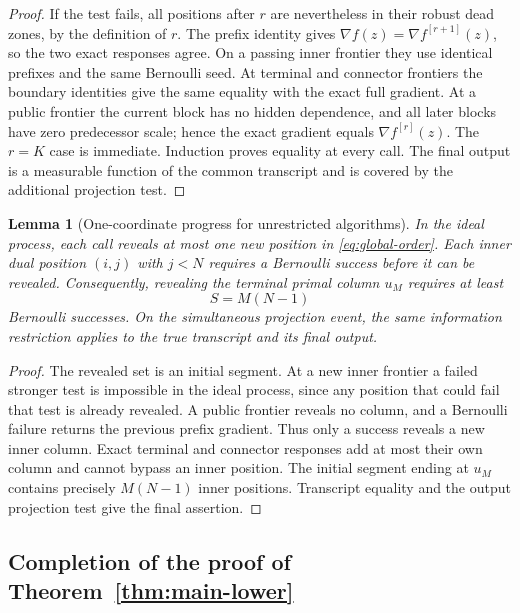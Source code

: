 \documentclass[11pt,a4paper]{article}
\newtheorem{lemma}[theorem]{Lemma}
\theoremstyle{definition}
\theoremstyle{remark}
\numberwithin{equation}{section}
\begin{document}
\begin{proof}
If the test fails, all positions after $r$ are nevertheless in their
robust dead zones, by the definition of $r$.  The prefix identity gives
$\nabla f(z)=\nabla f^{[r+1]}(z)$, so the two exact responses agree.
On a passing inner frontier they use identical prefixes and the same
Bernoulli seed.  At terminal and connector frontiers the boundary
identities give the same equality with the exact full gradient.  At a
public frontier the current block has no hidden dependence, and all
later blocks have zero predecessor scale; hence the exact gradient
equals $\nabla f^{[r]}(z)$.  The $r=K$ case is immediate.
Induction proves equality at every call.  The final output is a
measurable function of the common transcript and is covered by the
additional projection test.
\end{proof}

\begin{lemma}[One-coordinate progress for unrestricted algorithms]
\label{lem:progress}
In the ideal process, each call reveals at most one new position in
\eqref{eq:global-order}.  Each inner dual position $(i,j)$ with $j<N$
requires a Bernoulli success before it can be revealed.  Consequently,
revealing the terminal primal column $u_M$ requires at least
\begin{equation}
 S=M(N-1)
 \label{eq:S}
\end{equation}
Bernoulli successes.  On the simultaneous projection event, the same
information restriction applies to the true transcript and its final
output.
\end{lemma}

\begin{proof}
The revealed set is an initial segment.  At a new inner frontier a
failed stronger test is impossible in the ideal process, since any
position that could fail that test is already revealed.  A public
frontier reveals no column, and a Bernoulli failure returns the previous
prefix gradient.  Thus only a success reveals a new inner column.
Exact terminal and connector responses add at most their own column
and cannot bypass an inner position.  The initial segment ending at
$u_M$ contains precisely $M(N-1)$ inner positions.  Transcript equality
and the output projection test give the final assertion.
\end{proof}
\subsection{Completion of the proof of Theorem~\ref{thm:main-lower}}
\label{sec:completion}
\end{document}
